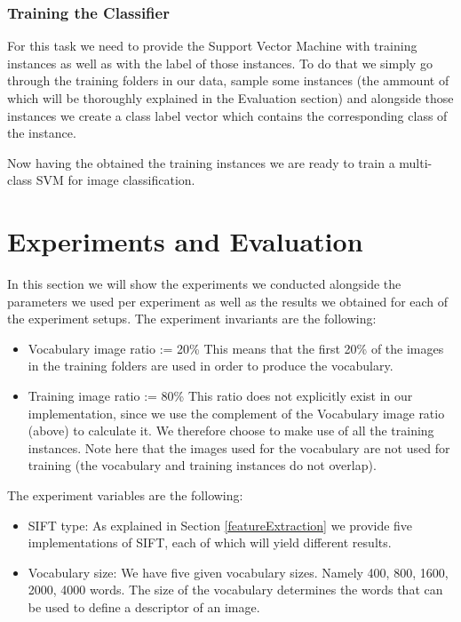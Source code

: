 \documentclass[11pt]{article}
\begin{document}
\subsubsection{Training the Classifier}
For this task we need to provide the Support Vector Machine with training instances as well as with the label of those instances. To do that we simply go through the training folders in our data, sample some instances (the ammount of which will be thoroughly explained in the Evaluation section) and alongside those instances we create a class label vector which contains the corresponding class of the instance.

Now having the obtained the training instances we are ready to train a multi-class SVM for image classification.

\section{Experiments and Evaluation}
In this section we will show the experiments we conducted alongside the parameters we used per experiment as well as the results we obtained for each of the experiment setups. The experiment invariants are the following:
    \begin{itemize}
        \item Vocabulary image ratio := 20\% This means that the first 20\% of the images in the training folders are used in order to produce the vocabulary.
        \item Training image ratio := 80\% This ratio does not explicitly exist in our implementation, since we use the complement of the Vocabulary image ratio (above) to calculate it. We therefore choose to make use of all the training instances. Note here that the images used for the vocabulary are not used for training (the vocabulary and training instances do not overlap).
    \end{itemize}
The experiment variables are the following:
    \begin{itemize}
        \item SIFT type: As explained in Section \ref{featureExtraction} we provide five implementations of SIFT, each of which will yield different results.
        \item Vocabulary size: We have five given vocabulary sizes. Namely 400, 800, 1600, 2000, 4000 words. The size of the vocabulary determines the words that can be used to define a descriptor of an image.
    \end{itemize}
\end{document}
